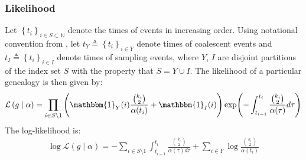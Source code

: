 \documentclass{report}
\newcommand{\N}{\mathbb{N}}
\theoremstyle{definition}
\begin{document}
\subsubsection{Likelihood}\label{subsection:likelihood}
Let $\left\{t_i\right\}_{i\in S\subset \N}$ denote the times of events in increasing order. Using notational convention from \cite{drummond_estimating_2002}, let $t_Y\triangleq \left\{t_i\right\}_{i\in Y}$ denote times of coalescent events and $t_I\triangleq \left\{t_i\right\}_{i\in I}$ denote times of sampling events, where $Y$, $I$ are disjoint partitions of the index set $S$ with the property that $S = Y\cup I$.
The likelihood of a particular genealogy is then given by:
\begin{gather}
\mathcal{L}\left(g\mid \alpha\right) 
= \prod_{i\in S\setminus 1}\left(\mathbbm{1}_Y(i)\frac{\binom{k_{i}}{2}}{\alpha(t_i)}+\mathbbm{1}_I(i)\right)
\exp(-\int_{t_{i-1}}^{t_i}\frac{\binom{k_{i}}{2}}{\alpha(\tau)}d\tau)
\end{gather}
The log-likelihood is:
\begin{gather}
\log\mathcal{L}\left(g\mid \alpha\right) 
= -\sum_{i\in S\setminus 1}{\int_{t_{i-1}}^{t_i}{\frac{\binom{k_{i}}{2}}{\alpha(\tau)d\tau}}} + \sum_{i\in Y}{\log\frac{\binom{k_{i}}{2}}{\alpha(t_i)}}
\end{gather}
\end{document}
